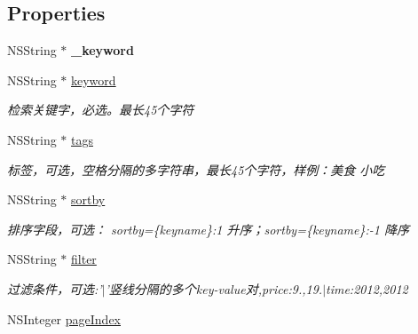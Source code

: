 \subsection*{Properties}
\begin{DoxyCompactItemize}
\item 
\hypertarget{interface_b_m_k_cloud_search_info_a5422fe46667de549c2b294ceb921a78b}{N\-S\-String $\ast$ {\bfseries \-\_\-keyword}}\label{interface_b_m_k_cloud_search_info_a5422fe46667de549c2b294ceb921a78b}

\item 
\hypertarget{interface_b_m_k_cloud_search_info_a90f2d3ef36a31112ca8fdb6d70fabea6}{N\-S\-String $\ast$ \hyperlink{interface_b_m_k_cloud_search_info_a90f2d3ef36a31112ca8fdb6d70fabea6}{keyword}}\label{interface_b_m_k_cloud_search_info_a90f2d3ef36a31112ca8fdb6d70fabea6}

\begin{DoxyCompactList}\small\item\em 检索关键字，必选。最长45个字符 \end{DoxyCompactList}\item 
\hypertarget{interface_b_m_k_cloud_search_info_ae2c16f1281195d1fbf738ac23552d8f7}{N\-S\-String $\ast$ \hyperlink{interface_b_m_k_cloud_search_info_ae2c16f1281195d1fbf738ac23552d8f7}{tags}}\label{interface_b_m_k_cloud_search_info_ae2c16f1281195d1fbf738ac23552d8f7}

\begin{DoxyCompactList}\small\item\em 标签，可选，空格分隔的多字符串，最长45个字符，样例：美食 小吃 \end{DoxyCompactList}\item 
N\-S\-String $\ast$ \hyperlink{interface_b_m_k_cloud_search_info_ab0d42d1b9e841c5e538e457e819a07f7}{sortby}
\begin{DoxyCompactList}\small\item\em 排序字段，可选： sortby=\{keyname\}\-:1 升序；sortby=\{keyname\}\-:-\/1 降序 \end{DoxyCompactList}\item 
N\-S\-String $\ast$ \hyperlink{interface_b_m_k_cloud_search_info_a65d91501d19f2a6aa027de6f9e5bc837}{filter}
\begin{DoxyCompactList}\small\item\em 过滤条件，可选\-:'$|$'竖线分隔的多个key-\/value对,price\-:9.,19.$|$time\-:2012,2012 \end{DoxyCompactList}\item 
\hypertarget{interface_b_m_k_cloud_search_info_aeea99c3907cafe38def8105839ad4c8a}{N\-S\-Integer \hyperlink{interface_b_m_k_cloud_search_info_aeea99c3907cafe38def8105839ad4c8a}{page\-Index}}\label{interface_b_m_k_cloud_search_info_aeea99c3907cafe38def8105839ad4c8a}


\end{DoxyCompactItemize}
